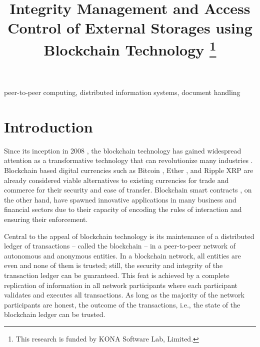 \documentclass[conference]{IEEEtran}
\begin{document}
\title{Integrity Management and Access Control of External Storages using Blockchain Technology 
	\thanks{This research is funded by KONA Software Lab, Limited.}
}

\author{
	\and
}
\maketitle

\begin{abstract}
\end{abstract}

\begin{IEEEkeywords}
peer-to-peer computing, distributed information systems, document handling  
\end{IEEEkeywords}

\section{Introduction}
\label{s-intro}
Since its inception in 2008 \cite{bitcoin}, the blockchain technology has gained widespread attention as a transformative technology that can revolutionize many industries \cite{deloitte}. Blockchain based digital currencies such as Bitcoin \cite{bitcoin}, Ether \cite{Wood2014EthereumAS}, and Ripple XRP \cite{David2014TheRP} are already considered viable alternatives to existing currencies for trade and commerce for their security and ease of transfer. Blockchain smart contracts \cite{FM548} \cite{Wood2014EthereumAS}, on the other hand, have spawned innovative applications in many business and financial sectors due to their capacity of encoding the rules of interaction and ensuring their enforcement.

Central to the appeal of blockchain technology is its maintenance of a distributed ledger of transactions --  called the blockchain -- in a peer-to-peer network of autonomous and anonymous entities. In a blockchain network, all entities are even and none of them is trusted; still, the security and integrity of the transaction ledger can be guaranteed. This feat is achieved by a complete replication of information in all network participants where each participant validates and executes all transactions. As long as the majority of the network participants are honest, the outcome of the transactions, i.e., the state of the blockchain ledger can be trusted.
\end{document}
